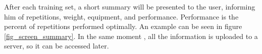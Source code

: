 \documentclass{tk3-team}
\begin{document}
After each training set, a short summary will be presented to the user, informing him of repetitions, weight, equipment, and performance. Performance is the percent of repetitions performed optimally. An example can be seen in figure \ref{fig_screen_summary}. In the same moment , all the information is uploaded to a server, so it can be accessed later.

\begin{figure}[!t]
\centering
{}
\hfil
{}
\hfil
{}
\\
\hfil
{}
\end{figure}
\end{document}
